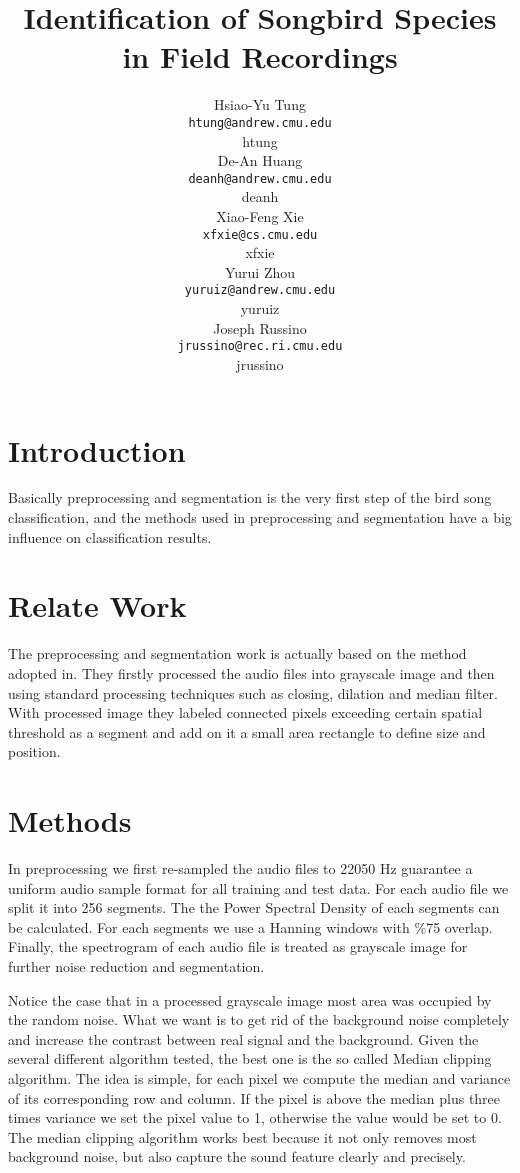 \documentclass{article} %
\title{Identification of Songbird Species in Field Recordings
}
\author{
Hsiao-Yu Tung \\
\texttt{htung@andrew.cmu.edu} \\
htung \\
\And
De-An Huang \\
\texttt{deanh@andrew.cmu.edu} \\
deanh \\
\And
Xiao-Feng Xie \\
\texttt{xfxie@cs.cmu.edu} \\
xfxie \\
\And
Yurui Zhou\\
\texttt{yuruiz@andrew.cmu.edu}\\
yuruiz \\
\And
Joseph Russino\\
\texttt{jrussino@rec.ri.cmu.edu}\\
jrussino \\
}
\begin{document}
\maketitle

\begin{abstract}
\end{abstract}

\section{Introduction}
Basically preprocessing and segmentation is the very first step of the bird song classification, and the methods used in preprocessing and segmentation have a big influence on classification results.

\section{Relate Work}
The preprocessing and segmentation work is actually based on the method adopted in\cite{Lasseck13}. They firstly processed the audio files into grayscale image and then using standard processing techniques such as closing, dilation and median filter. With processed image they labeled connected pixels exceeding certain spatial threshold as a segment and add on it a small area rectangle to define size and position.

\section{Methods}
In preprocessing we first re-sampled the audio files to 22050 Hz guarantee a uniform audio sample format for all training and test data. For each audio file we split it into 256 segments. The the Power Spectral Density of each segments can be calculated. For each segments we use a Hanning windows with \%75 overlap. Finally, the spectrogram of each audio file is treated as grayscale image for further noise reduction and segmentation.

Notice the case that in a processed grayscale image most area was occupied by the random noise. What we want is to get rid of the background noise completely and increase the contrast between real signal and the background. Given the several different algorithm tested, the best one is the so called Median clipping algorithm. The idea is simple, for each pixel we compute the median and variance of its corresponding row and column. If the pixel is above the median plus three times variance we set the pixel value to 1, otherwise the value would be set to 0. The median clipping algorithm works best because it not only removes most background noise, but also capture the sound feature clearly and precisely.
\end{document}
